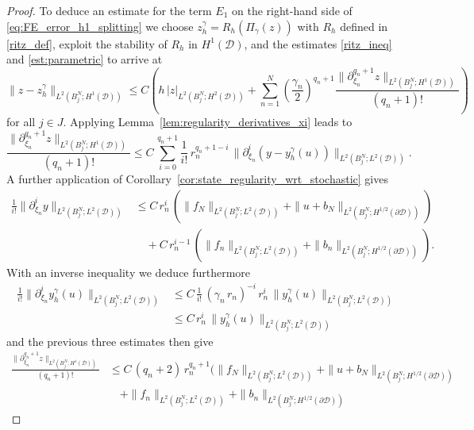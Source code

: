 \documentclass[10pt,a4paper]{amsart}
\newcommand{\cD}{{\mathcal{D}}}
\begin{document}
\begin{proof}
To deduce an estimate for the term $E_1$ on the right-hand side of \eqref{eq:FE_error_h1_splitting} 
we choose $z_h^\gamma = R_h(\Pi_\gamma(z))$ with $R_h$ defined in \eqref{ritz_def}, exploit the stability of $R_h$ in $H^1(\cD)$, and the estimates \eqref{ritz_ineq} and \eqref{est:parametric} to arrive at
\begin{equation}
  \label{eq:error_est_dual_solution}
  \|z-z_h^\gamma\|_{L^2(B_j^N; H^1(\cD))}
  \le C\left(h\,|z|_{L^2(B_j^N; H^2(\cD))} + \sum_{n=1}^N \left(\frac{\gamma_n}{2}\right)^{q_n+1} \frac{\|\partial_{\xi_n}^{q_n+1} z\|_{L^2(B_j^N; H^1(\cD))}}{(q_n+1)!}\right)
\end{equation}
for all $j\in J$.
Applying Lemma~\ref{lem:regularity_derivatives_xi} leads to
  \begin{equation*}
    \frac{\|\partial_{\xi_n}^{q_n+1} z\|_{L^2(B_j^N; H^1(\cD))}}{(q_n+1)!}
    \le
    C\,\sum_{i=0}^{q_n+1} \frac{1}{i!}\,r_n^{q_n+1-i}\,\|\partial_{\xi_n}^i (y-y_h^\gamma(u))\|_{L^2(B_j^N; L^2(\cD))}.
  \end{equation*}
  A further application of Corollary~\ref{cor:state_regularity_wrt_stochastic} gives  %
  \begin{align*}
    \frac1{i!} \|\partial_{\xi_n}^i y\|_{L^2(B_j^N; L^2(\cD))}
    &\le
      C\,r_n^i\, \left(\|f_N\|_{L^2(B_j^N; L^2(\cD))} + \|u + b_N\|_{L^2(B_j^N; H^{1/2}(\partial\cD))}\right) \\
    &\quad +   C\,r_n^{i-1}\,\left(\|f_n\|_{L^2(B_j^N; L^2(\cD))} +
      \|b_n\|_{L^2(B_j^N; H^{1/2}(\partial\cD))}\right).
  \end{align*}
  With an inverse inequality we deduce furthermore
  \begin{align*}
    \frac1{i!} \|\partial_{\xi_n}^i y_h^\gamma(u)\|_{L^2(B_j^N; L^2(\cD))} &\le C\,\frac{1}{i!}\,(\gamma_n\,r_n)^{-i}\,r_n^i \,\|y_h^\gamma(u)\|_{L^2(B_j^N; L^2(\cD))} \\
    &\le C\,r_n^i\,\|y_h^\gamma(u)\|_{L^2(B_j^N; L^2(\cD))}
  \end{align*}
  and the previous three estimates then give
  \begin{align*}
    \frac{\|\partial_{\xi_n}^{q_n+1} z\|_{L^2(B_j^N; H^1(\cD))}}{(q_n+1)!}
    &\le C\,
    (q_n+2)\,r_n^{q_n+1}
    \Big(\|f_N\|_{L^2(B_j^N; L^2(\cD))} + \|u + b_N\|_{L^2(B_j^N;H^{1/2}(\partial\cD))} \\
    & \quad + \|f_n\|_{L^2(B_j^N; L^2(\cD))} + \|b_n\|_{L^2(B_j^N; H^{1/2}(\partial\cD))}

\end{align*}
\end{proof}
\end{document}

